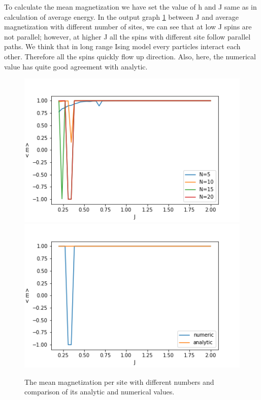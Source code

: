 \documentclass[11pt, a4paper, DIV=12]{scrartcl}
\begin{document}
To calculate the mean magnetization we have set the value of h and J same as in calculation of average energy. In the output graph \ref{fig:magnetization} between J and average magnetization with different number of sites, we can see that at low J spins are not parallel; however, at higher J all the spins with different site follow parallel paths. We think that in long range Ising model every particles interact each other. Therefore all the spins quickly flow up direction. Also, here, the numerical value has quite good agreement with analytic. 
\begin{figure}[H]
	\centering
	\includegraphics[width=0.6\linewidth]{magnitization.png}\includegraphics[width=0.6\linewidth]{magnitization_comparision.png}
	\caption{The mean magnetization per site with different numbers and comparison of its analytic and numerical values.}
	\label{fig:magnetization}
\end{figure}
\end{document}
